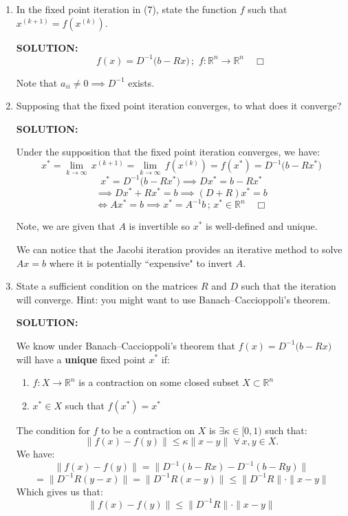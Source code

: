 \documentclass[]{article}
\begin{document}
\begin{enumerate}
  \item In the fixed point iteration in (7), state the function $f$ such that $x^{(k+1)}=f\!\left(x^{(k)}\right)$.

    \noindent \textbf{SOLUTION:}
    \[
    f(x)=D^{-1}\bigl(b-Rx\bigr) \, ; \, \, f:\mathbb{R}^n \to \mathbb{R}^n \quad \Box
    \]

Note that $a_{ii} \neq 0 \implies D^{-1}$ exists.
  
  \item Supposing that the fixed point iteration converges, to what does it converge?

      \noindent \textbf{SOLUTION:}

      Under the supposition that the fixed point iteration converges, we have:
  \[
x^* = \lim_{k\to\infty}\, x^{(k+1)} =  \lim_{k\to\infty} \,  f(x^{(k)}) =f(x^*) = D^{-1}\bigl(b-Rx^*\bigr)
  \]
\[
x^* = D^{-1}\bigl(b-Rx^*\bigr) \implies Dx^*=b-Rx^*
\]
\[
\implies Dx^*+Rx^*=b \implies (D+R)x^* =b
\]
\[
\iff Ax^* = b \implies x^* = A^{-1}b\, ; \, x^* \in \mathbb{R}^n \quad \Box
\]

Note, we are given that $A$ is invertible so $x^*$ is well-defined and unique.

We can notice that the Jacobi iteration provides an iterative method to solve $Ax=b$ where it is potentially ``expensive" to invert $A$.
   
  \item State a sufficient condition on the matrices $R$ and $D$ such that the iteration will converge. Hint: you might want to use Banach--Caccioppoli's theorem.
  
        \noindent \textbf{SOLUTION:}
        
     We know under Banach--Caccioppoli's theorem that $f(x)=D^{-1}\bigl(b-Rx\bigr)$ will have a \textbf{unique} fixed point $x^*$ if:
      \begin{enumerate}
          \item $f:X\to \mathbb{R}^n$ is a contraction on some closed subset $X \subset \mathbb{R}^n$
          \item $x^* \in X$ such that $f(x^*) = x^*$
      \end{enumerate}

      The condition for $f$ to be a contraction on $X$ is $\exists \kappa \in [0,1)$ such that:
      \[
      \|f(x)-f(y)\| \leq \kappa \|x-y\| \, \, \forall \, x,y \in X.
      \]
      We have:
      \[
      \|f(x)-f(y)\| = \|D^{-1}(b-Rx) - D^{-1}(b-Ry)\| 
      \]
      \[
      = \|D^{-1}R(y-x)\| = \|D^{-1}R(x-y)\|\leq \|D^{-1}R\|\cdot\|x-y\| 
      \]
      Which gives us that:
        \[
        \|f(x)-f(y)\| \leq \|D^{-1}R\|\cdot\|x-y\| 
        \]


\end{enumerate}
\end{document}
